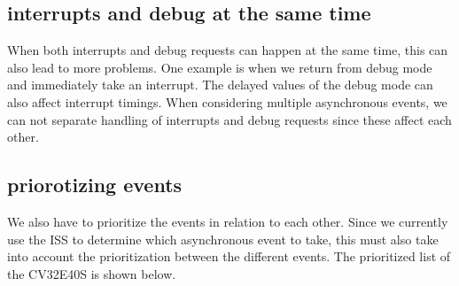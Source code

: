 \subsection{interrupts and debug at the same time}

When both interrupts and debug requests can happen at the same time, this can also lead to more problems. One example is when we return from debug mode and immediately take an interrupt. The delayed values of the debug mode can also affect interrupt timings. 
When considering multiple asynchronous events, we can not separate handling of interrupts and debug requests since these affect each other.


%
%
%
%


\subsection{priorotizing events}

We also have to prioritize the events in relation to each other. Since we currently use the ISS to determine which asynchronous event to take, this must also take into account the prioritization between the different events. The prioritized list of the CV32E40S \cite{openhwgroupCv32e40s2024} is shown below.

